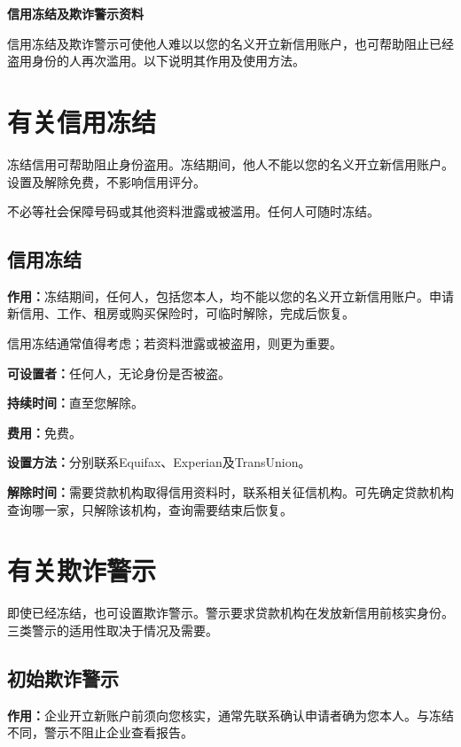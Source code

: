\documentclass[UTF8,fontset=none,11pt,a4paper]{ctexart}
\begin{document}
{\noindent\fontsize{20}{25}\selectfont\bfseries 信用冻结及欺诈警示资料\par}
\vspace{10pt}
信用冻结及欺诈警示可使他人难以以您的名义开立新信用账户，也可帮助阻止已经盗用身份的人再次滥用。以下说明其作用及\allowbreak\mbox{使用方法。}


\section*{有关信用冻结}
冻结信用可帮助阻止身份盗用。冻结期间，他人不能以您的名义开立新信用账户。设置及解除免费，不影响\allowbreak\mbox{信用评分。}


不必等社会保障号码或其他资料泄露或被滥用。任何人可\allowbreak\mbox{随时冻结。}


\subsection*{信用冻结}
\textbf{作用：}冻结期间，任何人，包括您本人，均不能以您的名义开立新信用账户。申请新信用、工作、租房或购买保险时，可临时解除，完\allowbreak\mbox{成后恢复。}


信用冻结通常值得考虑；若资料泄露或被盗用，则\allowbreak\mbox{更为重要。}


\textbf{可设置者：}任何人，无论身份\allowbreak\mbox{是否被盗。}


\textbf{持续时间：}直\allowbreak\mbox{至您解除。}


\textbf{费用：}免费。


\textbf{设置方法：}分别联系Equifax、Experian及TransUnion。


\textbf{解除时间：}需要贷款机构取得信用资料时，联系相关征信机构。可先确定贷款机构查询哪一家，只解除该机构，查询需要结\allowbreak\mbox{束后恢复。}


\section*{有关欺诈警示}
即使已经冻结，也可设置欺诈警示。警示要求贷款机构在发放新信用前核实身份。三类警示的适用性取决于情\allowbreak\mbox{况及需要。}


\subsection*{初始欺诈警示}
\textbf{作用：}企业开立新账户前须向您核实，通常先联系确认申请者确为您本人。与冻结不同，警示不阻止企业\allowbreak\mbox{查看报告。}
\end{document}
